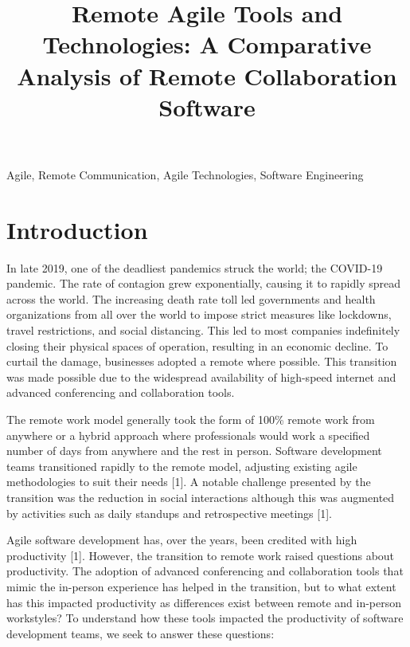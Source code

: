 \documentclass[conference]{IEEEtran}
\begin{document}
\title{Remote Agile Tools and Technologies: A Comparative Analysis of Remote Collaboration Software\\
}

\author{

}
\maketitle

\begin{IEEEkeywords}
Agile, Remote Communication, Agile Technologies, Software Engineering
\end{IEEEkeywords}

\section{Introduction}
In late 2019, one of the deadliest pandemics struck the world; the COVID-19 pandemic. The rate of contagion grew exponentially, causing it to rapidly spread across the world. The increasing death rate toll led governments and health organizations from all over the world to impose strict measures like lockdowns, travel restrictions, and social distancing. This led to most companies indefinitely closing their physical spaces of operation, resulting in an economic decline. To curtail the damage, businesses adopted a remote where possible. This transition was made possible due to the widespread availability of high-speed internet and advanced conferencing and collaboration tools.

The remote work model generally took the form of 100\% remote work from anywhere or a hybrid approach where professionals would work a specified number of days from anywhere and the rest in person. Software development teams transitioned rapidly to the remote model, adjusting existing agile methodologies to suit their needs [1]. A notable challenge presented by the transition was the reduction in social interactions although this was augmented by activities such as daily standups and retrospective meetings [1].

Agile software development has, over the years, been credited with high productivity [1].  However, the transition to remote work raised questions about productivity. The adoption of advanced conferencing and collaboration tools that mimic the in-person experience has helped in the transition, but to what extent has this impacted productivity as differences exist between remote and in-person workstyles? To understand how these tools impacted the productivity of software development teams, we seek to answer these questions:
\end{document}
